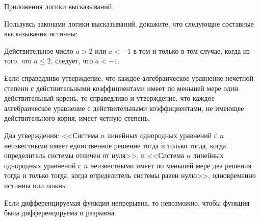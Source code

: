


	{Приложения логики высказываний.}
	
	\begin{problemList}
		{Пользуясь законами логики высказываний, докажите, что следующие составные высказывания истинны:}
		
		\begin{belarusianEnumerate}
			{Действительное число $a > 2$ или $a < -1$ в том и только в том случае, когда из того, что $a \le 2$, следует, что $a < -1$.}
			
			{Если справедливо утверждение, что каждое алгебраическое уравнение нечетной степени с действительными коэффициентами имеет по меньшей мере один действительный корень, то справедливо и утверждение, что каждое алгебраическое уравнение с действительными коэффициентами, не имеющее действительного корня, имеет четную степень.}
		
			{Два утверждения: <<Система $n$ линейных однородных уравнений с $n$ неизвестными имеет единственное решение тогда и только тогда, когда определитель системы отличен от нуля>>, и <<Система $n$ линейных однородных уравнений с $n$ неизвестными имеет по меньшей мере два решения тогда и только тогда, когда определитель системы равен нулю>>, одновременно истинны или ложны.}
			
			{Если дифференцируемая функция непрерывна, то невозможно, чтобы функция была дифференцируема и разрывна.}
			

\end{belarusianEnumerate}
\end{problemList}
